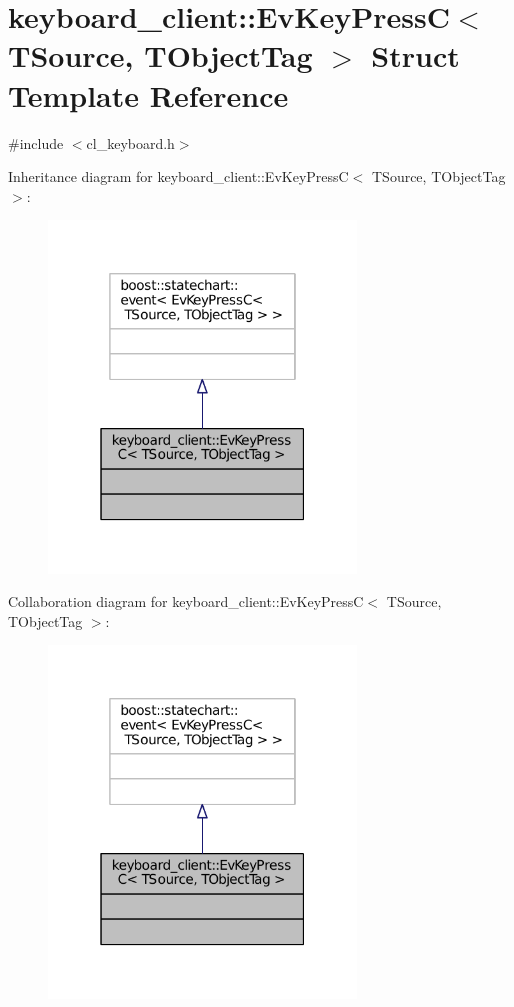 \hypertarget{structkeyboard__client_1_1EvKeyPressC}{}\section{keyboard\+\_\+client\+:\+:Ev\+Key\+PressC$<$ T\+Source, T\+Object\+Tag $>$ Struct Template Reference}
\label{structkeyboard__client_1_1EvKeyPressC}


{\ttfamily \#include $<$cl\+\_\+keyboard.\+h$>$}



Inheritance diagram for keyboard\+\_\+client\+:\+:Ev\+Key\+PressC$<$ T\+Source, T\+Object\+Tag $>$\+:
\nopagebreak
\begin{figure}[H]
\begin{center}
\leavevmode
\includegraphics[width=232pt]{structkeyboard__client_1_1EvKeyPressC__inherit__graph}
\end{center}
\end{figure}


Collaboration diagram for keyboard\+\_\+client\+:\+:Ev\+Key\+PressC$<$ T\+Source, T\+Object\+Tag $>$\+:
\nopagebreak
\begin{figure}[H]
\begin{center}
\leavevmode
\includegraphics[width=232pt]{structkeyboard__client_1_1EvKeyPressC__coll__graph}
\end{center}
\end{figure}



